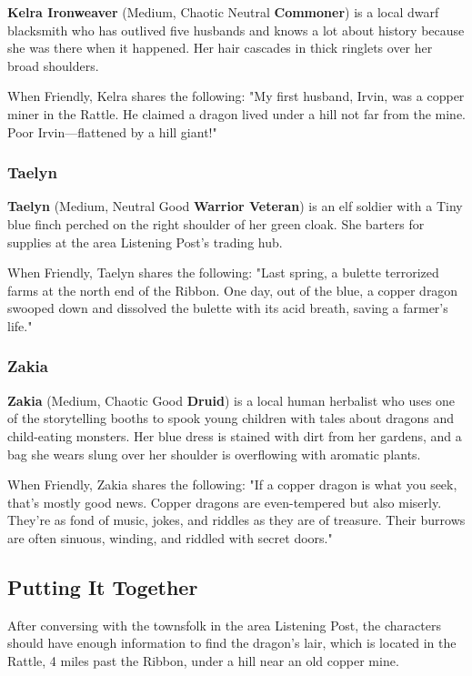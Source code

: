 \documentclass[letterpaper, 11pt, twocolumn]{dndbook}
\begin{document}
\textbf{Kelra Ironweaver} (Medium, Chaotic Neutral \textbf{Commoner}) is a local dwarf blacksmith who has outlived five husbands and knows a lot about history because she was there when it happened. Her hair cascades in thick ringlets over her broad shoulders.

When Friendly, Kelra shares the following: "My first husband, Irvin, was a copper miner in the Rattle. He claimed a dragon lived under a hill not far from the mine. Poor Irvin---flattened by a hill giant!"

\subsubsection{Taelyn}

\textbf{Taelyn} (Medium, Neutral Good \textbf{Warrior Veteran}) is an elf soldier with a Tiny blue finch perched on the right shoulder of her green cloak. She barters for supplies at the area Listening Post's trading hub.

When Friendly, Taelyn shares the following: "Last spring, a bulette terrorized farms at the north end of the Ribbon. One day, out of the blue, a copper dragon swooped down and dissolved the bulette with its acid breath, saving a farmer's life."

\subsubsection{Zakia}

\textbf{Zakia} (Medium, Chaotic Good \textbf{Druid}) is a local human herbalist who uses one of the storytelling booths to spook young children with tales about dragons and child-eating monsters. Her blue dress is stained with dirt from her gardens, and a bag she wears slung over her shoulder is overflowing with aromatic plants.

When Friendly, Zakia shares the following: "If a copper dragon is what you seek, that's mostly good news. Copper dragons are even-tempered but also miserly. They're as fond of music, jokes, and riddles as they are of treasure. Their burrows are often sinuous, winding, and riddled with secret doors."


\subsection{Putting It Together}

After conversing with the townsfolk in the area Listening Post, the characters should have enough information to find the dragon's lair, which is located in the Rattle, 4 miles past the Ribbon, under a hill near an old copper mine.
\end{document}
